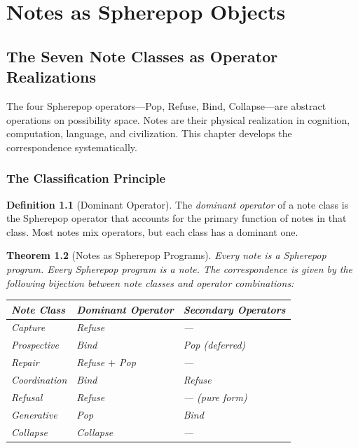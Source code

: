 \documentclass[12pt, a4paper, openany]{book}
\theoremstyle{plain}
\newtheorem{theorem}{Theorem}[chapter]
\theoremstyle{definition}
\newtheorem{definition}[theorem]{Definition}
\theoremstyle{remark}
\begin{document}
\part{Notes as Spherepop Objects}

\chapter{The Seven Note Classes as Operator Realizations}

The four Spherepop operators---Pop, Refuse, Bind, Collapse---are abstract
operations on possibility space. Notes are their physical realization in cognition,
computation, language, and civilization. This chapter develops the correspondence
systematically.

\section{The Classification Principle}

\begin{definition}[Dominant Operator]
The \emph{dominant operator} of a note class is the Spherepop operator that
accounts for the primary function of notes in that class. Most notes mix operators,
but each class has a dominant one.
\end{definition}

\begin{theorem}[Notes as Spherepop Programs]
Every note is a Spherepop program. Every Spherepop program is a note. The
correspondence is given by the following bijection between note classes and
operator combinations:
\begin{center}
\begin{tabular}{lll}
\toprule
Note Class & Dominant Operator & Secondary Operators \\
\midrule
Capture & Refuse & --- \\
Prospective & Bind & Pop (deferred) \\
Repair & Refuse $+$ Pop & --- \\
Coordination & Bind & Refuse \\
Refusal & Refuse & --- (pure form) \\
Generative & Pop & Bind \\
Collapse & Collapse & --- \\
\bottomrule
\end{tabular}
\end{center}
\end{theorem}
\end{document}
